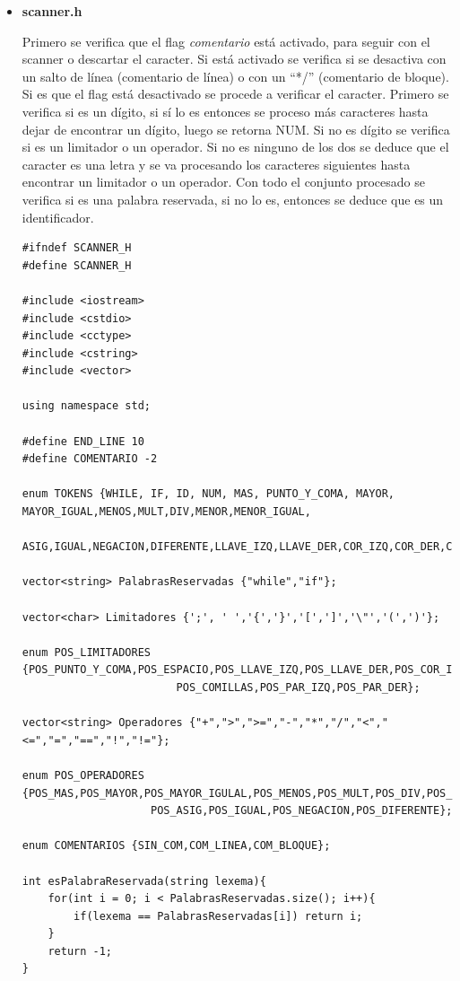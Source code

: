 \documentclass[a4paper,12pt]{article}
\begin{document}
\begin{itemize}
 \item \textbf{scanner.h}

 Primero se verifica que el flag \textit{comentario} está activado, para seguir con el scanner o descartar el caracter. Si está activado se verifica si se desactiva con un
 salto de línea (comentario de línea) o con un ``*/'' (comentario de bloque). Si es que el flag está desactivado se procede a verificar el caracter. Primero se verifica si es
 un dígito, si sí lo es entonces se proceso más caracteres hasta dejar de encontrar un dígito, luego se retorna NUM. Si no es dígito se verifica si es un limitador o
 un operador. Si no es ninguno de los dos se deduce que el caracter es una letra y se va procesando los caracteres siguientes hasta encontrar un limitador o un operador.
 Con todo el conjunto procesado se verifica si es una palabra reservada, si no lo es, entonces se deduce que es un identificador.
 
\begin{lstlisting}
#ifndef SCANNER_H
#define SCANNER_H

#include <iostream>
#include <cstdio>
#include <cctype>
#include <cstring>
#include <vector>

using namespace std;

#define END_LINE 10
#define COMENTARIO -2

enum TOKENS {WHILE, IF, ID, NUM, MAS, PUNTO_Y_COMA, MAYOR, MAYOR_IGUAL,MENOS,MULT,DIV,MENOR,MENOR_IGUAL,
            ASIG,IGUAL,NEGACION,DIFERENTE,LLAVE_IZQ,LLAVE_DER,COR_IZQ,COR_DER,COMILLAS,PAR_IZQ,PAR_DER};

vector<string> PalabrasReservadas {"while","if"};

vector<char> Limitadores {';', ' ','{','}','[',']','\"','(',')'};

enum POS_LIMITADORES {POS_PUNTO_Y_COMA,POS_ESPACIO,POS_LLAVE_IZQ,POS_LLAVE_DER,POS_COR_IZQ,POS_COR_DER,
                        POS_COMILLAS,POS_PAR_IZQ,POS_PAR_DER};

vector<string> Operadores {"+",">",">=","-","*","/","<","<=","=","==","!","!="};

enum POS_OPERADORES {POS_MAS,POS_MAYOR,POS_MAYOR_IGULAL,POS_MENOS,POS_MULT,POS_DIV,POS_MENOR,POS_MENOR_IGUAL,
                    POS_ASIG,POS_IGUAL,POS_NEGACION,POS_DIFERENTE};

enum COMENTARIOS {SIN_COM,COM_LINEA,COM_BLOQUE};

int esPalabraReservada(string lexema){
    for(int i = 0; i < PalabrasReservadas.size(); i++){
        if(lexema == PalabrasReservadas[i]) return i;
    }
    return -1;
}



\end{lstlisting}
\end{itemize}
\end{document}
